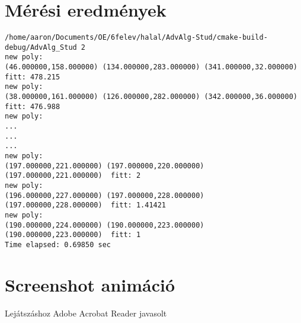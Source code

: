 \documentclass[12pt,a4paper,oneside]{report}
\begin{document}
\section*{Mérési eredmények}
\begin{lstlisting}
/home/aaron/Documents/OE/6felev/halal/AdvAlg-Stud/cmake-build-debug/AdvAlg_Stud 2
new poly: 
(46.000000,158.000000) (134.000000,283.000000) (341.000000,32.000000)  fitt: 478.215
new poly: 
(38.000000,161.000000) (126.000000,282.000000) (342.000000,36.000000)  fitt: 476.988
new poly: 
...
...
...
new poly: 
(197.000000,221.000000) (197.000000,220.000000) (197.000000,221.000000)  fitt: 2
new poly: 
(196.000000,227.000000) (197.000000,228.000000) (197.000000,228.000000)  fitt: 1.41421
new poly: 
(190.000000,224.000000) (190.000000,223.000000) (190.000000,223.000000)  fitt: 1
Time elapsed: 0.69850 sec
\end{lstlisting}

\section*{Screenshot animáció}
Lejátszáshoz Adobe Acrobat Reader javasolt\newline
\end{document}
